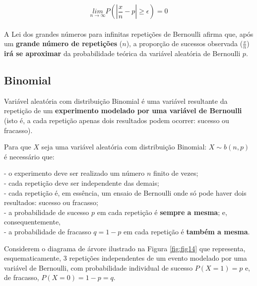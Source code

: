 \documentclass[
]{book}
\begin{document}
\hfill\break

\[
\underset{n\to \infty }{lim}P\left(\left|\frac{x}{n}-p\right|\ge \epsilon \right)=0
\]\\

A Lei dos grandes números para infinitas repetições de Bernoulli afirma que, após um \textbf{grande número de repetições} (\(n\)), a proporção de sucessos observada (\(\frac{x}{n}\)) \textbf{irá se aproximar} da probabilidade teórica da variável aleatória de Bernoulli \(p\).

\hypertarget{binomial}{%
\subsection{Binomial}\label{binomial}}

Variável aleatória com distribuição Binomial é uma variável resultante da repetição de um \textbf{experimento modelado por uma variável de Bernoulli} (isto é, a cada repetição apenas dois resultados podem ocorrer: sucesso ou fracasso).

\hfill\break

Para que \(X\) seja uma variável aleatória com distribuição Binomial: \(X\sim b(n,p)\) é necessário que:

\hfill\break
- o experimento deve ser realizado um número \(n\) finito de vezes;\\
- cada repetição deve ser independente das demais;\\
- cada repetição é, em essência, um ensaio de Bernoulli onde só pode haver dois resultados: sucesso ou fracasso;\\
- a probabilidade de sucesso \(p\) em cada repetição é \textbf{sempre a mesma}; e, consequentemente,\\
- a probabilidade de fracasso \(q=1-p\) em cada repetição é \textbf{também a mesma}.

\hfill\break

Considerem o diagrama de árvore ilustrado na Figura \ref{fig:fig14} que representa, esquematicamente, 3 repetições independentes de um evento modelado por uma variável de Bernoulli, com probabilidade individual de sucesso \(P(X=1)=p\) e, de fracasso, \(P(X=0)=1-p=q\).

\hfill\break
\end{document}

